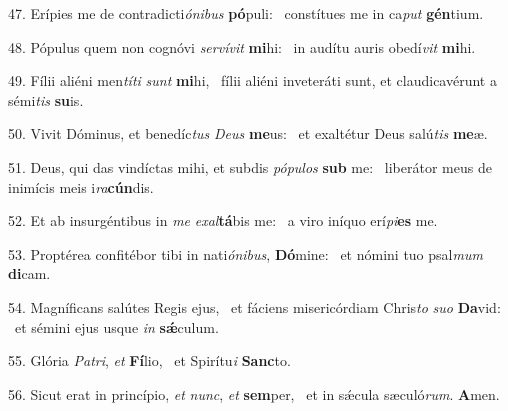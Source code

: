 47. Erípies me de contradicti\textit{ó}\textit{ni}\textit{bus} \textbf{pó}puli: \ast\  constítues me in ca\textit{put} \textbf{gén}tium.\

48. Pópulus quem non cognóvi \textit{ser}\textit{ví}\textit{vit} \textbf{mi}hi: \ast\  in audítu auris obedí\textit{vit} \textbf{mi}hi.\

49. Fílii aliéni men\textit{tí}\textit{ti} \textit{sunt} \textbf{mi}hi, \ast\  fílii aliéni inveteráti sunt, et claudicavérunt a sémi\textit{tis} \textbf{su}is.\

50. Vivit Dóminus, et benedíc\textit{tus} \textit{De}\textit{us} \textbf{me}us: \ast\  et exaltétur Deus salú\textit{tis} \textbf{me}æ.\

51. Deus, qui das vindíctas mihi, et subdis \textit{pó}\textit{pu}\textit{los} \textbf{sub} me: \ast\  liberátor meus de inimícis meis i\textit{ra}\textbf{cún}dis.\

52. Et ab insurgéntibus in \textit{me} \textit{ex}\textit{al}\textbf{tá}bis me: \ast\  a viro iníquo erí\textit{pi}\textbf{es} me.\

53. Proptérea confitébor tibi in nati\textit{ó}\textit{ni}\textit{bus}, \textbf{Dó}mine: \ast\  et nómini tuo psal\textit{mum} \textbf{di}cam.\

54. Magníficans salútes Regis ejus, \dag\  et fáciens misericórdiam Chris\textit{to} \textit{su}\textit{o} \textbf{Da}vid: \ast\  et sémini ejus usque \textit{in} \textbf{sǽ}culum.\

55. Glória \textit{Pa}\textit{tri}, \textit{et} \textbf{Fí}lio, \ast\  et Spirítu\textit{i} \textbf{Sanc}to.\

56. Sicut erat in princípio, \textit{et} \textit{nunc}, \textit{et} \textbf{sem}per, \ast\  et in sǽcula sæculó\textit{rum}. \textbf{A}men.\

